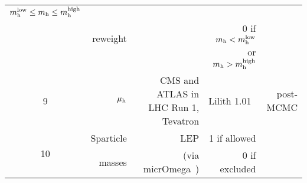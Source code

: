 \begin{table}[htb]
{\begin{tabular}{c|r|r|r|r}
$m_{\rm h}^{\rm low} \le m_{\rm h} \le m_{\rm h}^{\rm high}$ & \multirow{2}{*}{reweight} \T\B\\
   &             &                               & 0 if $m_{\rm h} <
   m_{\rm h}^{\rm low}$ or $m_{\rm h} > m_{\rm h}^{\rm high}$ & \B\\
\hline
9 & $\mu_{\rm h}$ & CMS and ATLAS in LHC Run 1, Tevatron & {\sc Lilith} 1.01~\cite{Bernon:2014vta,Bernon:2015hsa} & post-MCMC \\
\hline
\multirow{2}{*}{10} & Sparticle & LEP \cite{lepsusy} & 1 if allowed & \\
   & masses & (via {\sc micrOmega}~\cite{Belanger:2001fz,Belanger:2004yn,Belanger:2008sj}) & 0 if excluded &  \\
\hline
\end{tabular}
}
\end{table}
